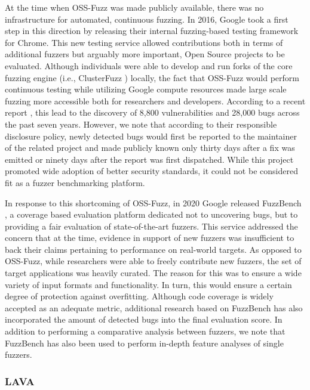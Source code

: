 At the time when OSS-Fuzz \cite{serebryany2017oss} was made publicly available, there was no infrastructure for automated, continuous fuzzing. In 2016, Google took a first step in this direction by releasing their internal fuzzing-based testing framework for Chrome. This new testing service allowed contributions both in terms of additional fuzzers but arguably more important, Open Source projects to be evaluated. Although individuals were able to develop and run forks of the core fuzzing engine (i.e., ClusterFuzz \cite{clusterfuzz}) locally, the fact that OSS-Fuzz would perform continuous testing while utilizing Google compute resources made large scale fuzzing more accessible both for researchers and developers. According to a recent report \cite{chang_2023}, this lead to the discovery of 8,800 vulnerabilities and 28,000 bugs across the past seven years. However, we note that according to their responsible disclosure policy, newly detected bugs would first be reported to the maintainer of the related project and made publicly known only thirty days after a fix was emitted or ninety days after the report was first dispatched. While this project promoted wide adoption of better security standards, it could not be considered fit as a fuzzer benchmarking platform.

In response to this shortcoming of OSS-Fuzz, in 2020 Google released FuzzBench \cite{fuzzbench,metzman2021fuzzbench}, a coverage based evaluation platform dedicated not to uncovering bugs, but to providing a fair evaluation of state-of-the-art fuzzers. This service addressed the concern that at the time, evidence in support of new fuzzers was insufficient \cite{klees2018evaluating} to back their claims pertaining to performance on real-world targets. As opposed to OSS-Fuzz, while researchers were able to freely contribute new fuzzers, the set of target applications was heavily curated. The reason for this was to ensure a wide variety of input formats and functionality. In turn, this would ensure a certain degree of protection against overfitting. Although code coverage is widely accepted as an adequate metric, additional research \cite{asprone2022comparing} based on FuzzBench has also incorporated the amount of detected bugs into the final evaluation score. In addition to performing a comparative analysis between fuzzers, we note that FuzzBench has also been used to perform in-depth feature analyses \cite{fioraldi2023dissecting} of single fuzzers.

\subsubsection{LAVA}
\label{extend:netfuzz:benchmarks:lava}

